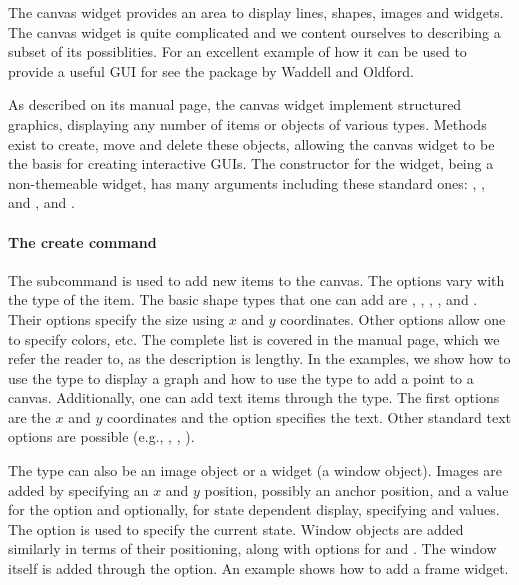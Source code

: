  
The canvas widget provides an area to display lines, shapes, images
and widgets. The canvas widget is quite complicated and we content
ourselves to describing a subset of its possiblities. For an excellent
example of how it can be used to provide a useful GUI for \R{} see the
 package by Waddell and Oldford.


As described on its manual page, the canvas widget implement
structured graphics, displaying any number of items or objects of
various types.  Methods exist to create, move and delete these
objects, allowing the canvas widget to be the basis for creating
interactive GUIs. The constructor  for the
widget, being a non-themeable widget, has many arguments including
these standard ones: ,
, and ,
 and
.


\paragraph{The create command}
The subcommand  is used
to add new items to the canvas. The options vary with the type of the
item. The basic shape types that one can add are ,
, , , and
. Their options specify the size using $x$ and $y$
coordinates. Other options allow one to specify colors, etc. The
complete list is covered in the  manual page, which we
refer the reader to, as the description is lengthy.  In the examples,
we show how to use the  type to display a graph and how to
use the  type to add a point to a canvas. Additionally,
one can add text items through the  type. The first
options are the $x$ and $y$ coordinates and the  option
specifies the text.  Other standard text options are possible (e.g.,
, , ).

The type can also be an image object or a widget (a window
object). Images are added by specifying an $x$ and $y$ position,
possibly an anchor position, and a value for the  option
and optionally, for state dependent display, specifying
 and  values. The
 option is used to specify the current state. Window
objects are added similarly in terms of their positioning, along with
options for  and . The window itself is
added through the  option. An example shows how to add a
frame widget.

